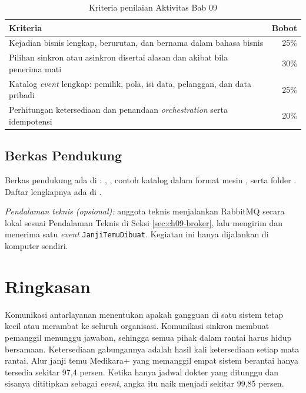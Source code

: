 \begin{table}[!htb]
  \centering
  \caption{Kriteria penilaian Aktivitas Bab 09}
  \label{tab:ch09-kriteria}
  \footnotesize
  \begin{tabularx}{\textwidth}{>{\raggedright\arraybackslash}X r}
    \hline
    \textbf{Kriteria} & \textbf{Bobot} \\ \hline
    Kejadian bisnis lengkap, berurutan, dan bernama dalam bahasa bisnis & 25\% \\ \hline
    Pilihan sinkron atau asinkron disertai alasan dan akibat bila penerima mati & 30\% \\ \hline
    Katalog \textit{event} lengkap: pemilik, pola, isi data, pelanggan, dan data pribadi & 25\% \\
      \hline
    Perhitungan ketersediaan dan penandaan \textit{orchestration} serta idempotensi & 20\% \\ \hline
  \end{tabularx}
\end{table}

\subsection*{Berkas Pendukung}

Berkas pendukung ada di : ,
, contoh katalog dalam format mesin
, serta folder . Daftar lengkapnya ada
di .

\textit{Pendalaman teknis (opsional):} anggota teknis menjalankan RabbitMQ secara lokal sesuai
Pendalaman Teknis di Seksi \ref{sec:ch09-broker}, lalu mengirim dan menerima satu \textit{event}
\texttt{JanjiTemuDibuat}. Kegiatan ini hanya dijalankan di komputer sendiri.

\section{Ringkasan}

Komunikasi antarlayanan menentukan apakah gangguan di satu sistem tetap kecil atau merambat ke
seluruh organisasi. Komunikasi sinkron membuat pemanggil menunggu jawaban, sehingga semua pihak
dalam rantai harus hidup bersamaan. Ketersediaan gabungannya adalah hasil kali ketersediaan setiap
mata rantai. Alur janji temu Medikara+ yang memanggil empat sistem berantai hanya tersedia sekitar
97,4 persen. Ketika hanya jadwal dokter yang ditunggu dan sisanya dititipkan sebagai
\textit{event}, angka itu naik menjadi sekitar 99,85 persen.

